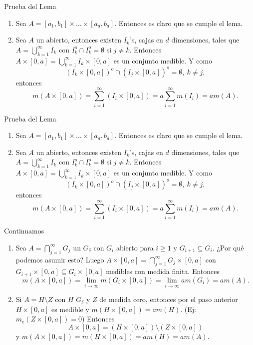 \documentclass[utf8]{beamer}
\theoremstyle{plain}
\theoremstyle{definition}
\theoremstyle{remark}
\numberwithin{equation}{section}
\newcommand{\dl}{\delta}                %
\newcommand{\x}{\times}
\renewcommand{\geq}{\geqslant}          %
\newcommand{\less}{\setminus}           %
\newcommand{\suci}{_{i=1}^\infty} %
\newcommand{\sucj}{_{j=1}^\infty} %
\newcommand{\suck}{_{k=1}^\infty} %
\renewcommand{\.}{\Cdot}                %
\begin{document}
\begin{frame}{Prueba del Lema}
  \begin{enumerate}
    \item Sea $A=[a_1,b_1]\x\dots\x[a_d,b_d]$. Entonces es claro que se cumple el lema.
    \item Sea $A$ un abierto, entonces existen $I_k$'s, cajas en $d$ dimensiones, tales que $A=\bigcup\suck I_k$ con $I_k^o\cap I_k^o=\emptyset$ si $j\neq k$. Entonces $A\x[0,a]=\bigcup\suck I_k\x[0,a]$ es un conjunto medible. Y como 
    $$(I_k\x [0,a])^o\cap (I_j\x [0,a])^o=\emptyset,\ k\neq j,$$
    entonces 
    $$m(A\x[0,a])=\sum\suci(I_i\x[0,a])=a\sum\suci m(I_i)=am(A).$$
  \end{enumerate}
\end{frame}

\begin{frame}{Prueba del Lema}
  \begin{enumerate}
    \item Sea $A=[a_1,b_1]\x\dots\x[a_d,b_d]$. Entonces es claro que se cumple el lema.
    \item Sea $A$ un abierto, entonces existen $I_k$'s, cajas en $d$ dimensiones, tales que $A=\bigcup\suck I_k$ con $I_k^o\cap I_k^o=\emptyset$ si $j\neq k$. Entonces $A\x[0,a]=\bigcup\suck I_k\x[0,a]$ es un conjunto medible. Y como 
    $$(I_k\x [0,a])^o\cap (I_j\x [0,a])^o=\emptyset,\ k\neq j,$$
    entonces 
    $$m(A\x[0,a])=\sum\suci(I_i\x[0,a])=a\sum\suci m(I_i)=am(A).$$
    \setcounter{saveenumi}{\value{enumi}}
  \end{enumerate}
\end{frame}

\begin{frame}{Continuamos}\label{ej:medCeroTimesInter}
  \begin{enumerate}
    \setcounter{enumi}{\value{saveenumi}}
    \item Sea $A=\bigcap\sucj G_j$ un $G_\dl$ con $G_i$ abierto para $i\geq 1$ y $G_{i+1}\subseteq G_i$. \alert{¿Por qué podemos asumir esto?} Luego $A\x [0,a]=\bigcap\sucj G_j\x[0,a]$ con $G_{i+1}\x[0,a]\subseteq G_i\x[0,a]$ medibles con medida finita. Entonces 
    $$m(A\x [0,a])=\lim_{i\to\infty}m(G_i\x[0,a])=\lim_{i\to\infty}am(G_i)=am(A).$$
    \item Si $A=H\less Z$ con $H$ $G_\dl$ y $Z$ de medida cero, entonces por el paso anterior $H\x[0,a]$ es medible y $m(H\x[0,a])=a m(H)$. \alert{(Ej:$m_e(Z\x[0,a])=0$)} Entonces 
    $$A\x[0,a]=(H\x[0,a])\less (Z\x[0,a])$$
    y $m(A\x[0,a])=m(H\x[0,a])=a m(H)=am(A)$.
    \setcounter{saveenumi}{\value{enumi}}
  \end{enumerate}
\end{frame}
\end{document}
